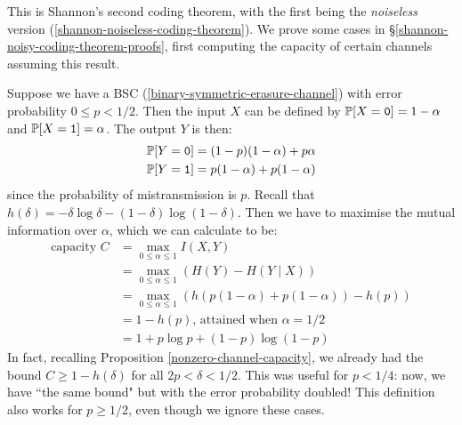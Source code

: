 \documentclass{article}
\begin{document}
\begin{note}
	This is Shannon's second coding theorem,
	with the first being the \textit{noiseless} version
	(\ref{shannon-noiseless-coding-theorem}).
	We prove some cases in \S\ref{shannon-noisy-coding-theorem-proofs},
	first computing the capacity of certain channels assuming this result.
\end{note}

\begin{example}
    Suppose we have a BSC (\ref{binary-symmetric-erasure-channel})
    with error probability $0 \leq p < 1/2$.
    Then the input $X$ can be defined by
    $\P[X = \texttt{0}] = 1-\alpha$ and $\P[X=\texttt{1}] = \alpha$.
    The output $Y$ is then:
    \begin{align*}
    	\P[Y = \texttt{0}] &= (1-p)(1-\alpha) + p\alpha \\
    	\P[Y = \texttt{1}] &= p(1-\alpha) + p(1-\alpha)
	\end{align*}
	since the probability of mistransmission is $p$.
	Recall that $h(\delta) = -\delta \log \delta - (1-\delta) \log(1-\delta)$.
	Then we have to maximise the mutual information over $\alpha$,
	which we can calculate to be:
	\begin{align*}
    	\text{capacity } C &= \max_{0 \leq \alpha \leq 1} I(X, Y) \\
    	&= \max_{0 \leq \alpha \leq 1} (H(Y) - H(Y \mid X)) \\
    	&= \max_{0 \leq \alpha \leq 1} (h(p(1-\alpha) + p(1-\alpha)) - h(p)) \\
    	&= 1 - h(p) \text{, attained when $\alpha = 1/2$}\\
    	&= 1 + p \log p + (1-p) \log(1-p)
	\end{align*}
	In fact, recalling Proposition \ref{nonzero-channel-capacity},
	we already had the bound $C \geq 1 - h(\delta)$ for all $2p < \delta < 1/2$.
	This was useful for $p < 1/4$: now, we have ``the same bound"
	but with the error probability doubled!
	This definition also works for $p \geq 1/2$,
	even though we ignore these cases.
\end{example}
\end{document}
